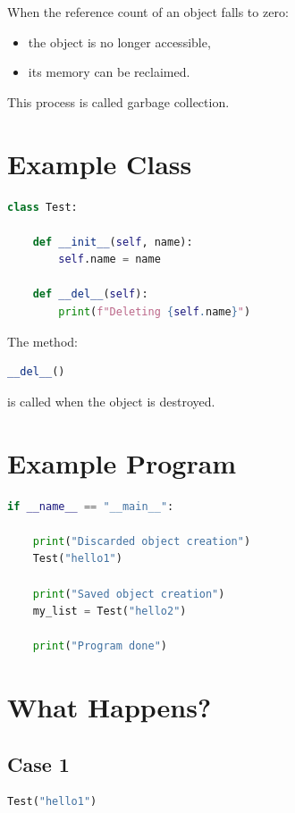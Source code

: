 \documentclass[11pt]{article}
\begin{document}
When the reference count of an object falls to zero:

\begin{itemize}
    \item the object is no longer accessible,
    \item its memory can be reclaimed.
\end{itemize}

This process is called garbage collection.

\section{Example Class}

\begin{lstlisting}[language=Python]
class Test:

    def __init__(self, name):
        self.name = name

    def __del__(self):
        print(f"Deleting {self.name}")
\end{lstlisting}

The method:

\begin{lstlisting}[language=Python]
__del__()
\end{lstlisting}

is called when the object is destroyed.

\section{Example Program}

\begin{lstlisting}[language=Python]
if __name__ == "__main__":

    print("Discarded object creation")
    Test("hello1")

    print("Saved object creation")
    my_list = Test("hello2")

    print("Program done")
\end{lstlisting}

\section{What Happens?}

\subsection{Case 1}

\begin{lstlisting}[language=Python]
Test("hello1")
\end{lstlisting}
\end{document}
